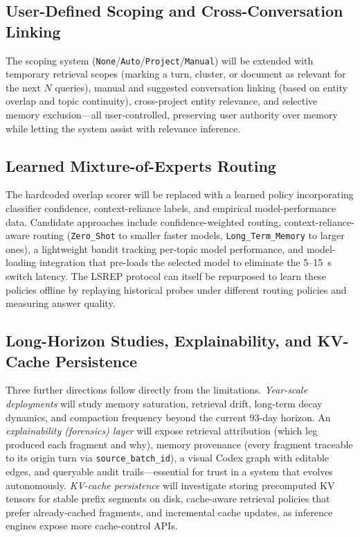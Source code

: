 \documentclass[11pt,a4paper]{article}
\begin{document}
\subsection{User-Defined Scoping and Cross-Conversation Linking}
The scoping system (\texttt{None}/\texttt{Auto}/\texttt{Project}/\texttt{Manual}) will be extended with temporary retrieval scopes (marking a turn, cluster, or document as relevant for the next $N$ queries), manual and suggested conversation linking (based on entity overlap and topic continuity), cross-project entity relevance, and selective memory exclusion---all user-controlled, preserving user authority over memory while letting the system assist with relevance inference.

\subsection{Learned Mixture-of-Experts Routing}
The hardcoded overlap scorer will be replaced with a learned policy incorporating classifier confidence, context-reliance labels, and empirical model-performance data. Candidate approaches include confidence-weighted routing, context-reliance-aware routing (\texttt{Zero\_Shot} to smaller faster models, \texttt{Long\_Term\_Memory} to larger ones), a lightweight bandit tracking per-topic model performance, and model-loading integration that pre-loads the selected model to eliminate the 5--15~s switch latency. The LSREP protocol can itself be repurposed to learn these policies offline by replaying historical probes under different routing policies and measuring answer quality.

\subsection{Long-Horizon Studies, Explainability, and KV-Cache Persistence}
Three further directions follow directly from the limitations. \emph{Year-scale deployments} will study memory saturation, retrieval drift, long-term decay dynamics, and compaction frequency beyond the current 93-day horizon. An \emph{explainability (forensics) layer} will expose retrieval attribution (which leg produced each fragment and why), memory provenance (every fragment traceable to its origin turn via \texttt{source\_batch\_id}), a visual Codex graph with editable edges, and queryable audit trails---essential for trust in a system that evolves autonomously. \emph{KV-cache persistence} will investigate storing precomputed KV tensors for stable prefix segments on disk, cache-aware retrieval policies that prefer already-cached fragments, and incremental cache updates, as inference engines expose more cache-control APIs.
\end{document}
